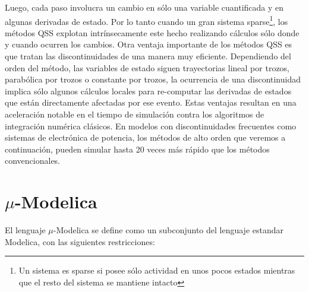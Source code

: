 	Luego, cada paso involucra un cambio en sólo una variable cuantificada y en algunas derivadas de estado. 
	Por lo tanto cuando un gran sistema sparse\footnote{Un sistema es sparse si posee sólo actividad en unos pocos estados mientras que el resto del sistema 
	se mantiene intacto}, los métodos QSS explotan intrínsecamente este hecho realizando cálculos sólo donde y cuando ocurren los cambios.
	Otra ventaja importante de los métodos QSS es que tratan las discontinuidades de una manera muy eficiente. Dependiendo del orden del método, 
	las variables de estado siguen trayectorias lineal por trozos, parabólica por trozos o constante por trozos, la ocurrencia de una discontinuidad implica 
	sólo algunos cálculos locales para re-computar las derivadas de estados que están directamente afectadas por ese evento.
	Estas ventajas resultan en una aceleración notable en el tiempo de simulación contra los algoritmos de integración numérica clásicos. 
	En modelos con discontinuidades frecuentes como sistemas de electrónica de potencia, los métodos de alto orden que veremos a continuación, 
	pueden simular hasta 20 veces más rápido que los métodos convencionales.


\section{$\mu$-Modelica}

	El lenguaje $\mu$-Modelica\cite{Ber12} se define como un subconjunto del lenguaje estandar Modelica, con las siguientes restricciones:

